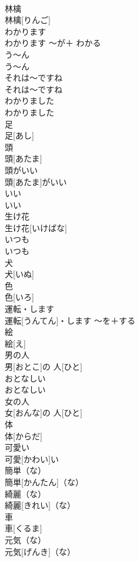 \documentclass[8pt]{extreport}
\begin{document}
\begin{CJK}{UTF8}{min}
\\	林檎	
\\	林檎[りんご]		
\\	わかります	
\\	わかります	〜が＋ わかる	
\\	う〜ん	
\\	う〜ん		
\\	それは〜ですね	
\\	それは〜ですね		
\\	わかりました	
\\	わかりました		
\\	足	
\\	足[あし]		
\\	頭	
\\	頭[あたま]		
\\	頭がいい	
\\	頭[あたま]がいい		
\\	いい	
\\	いい		
\\	生け花	
\\	生け花[いけばな]		
\\	いつも	
\\	いつも		
\\	犬	
\\	犬[いぬ]		
\\	色	
\\	色[いろ]		
\\	運転・します	
\\	運転[うんてん]・します	〜を＋する	
\\	絵	
\\	絵[え]		
\\	男の人	
\\	男[おとこ]の 人[ひと]		
\\	おとなしい	
\\	おとなしい		
\\	女の人	
\\	女[おんな]の 人[ひと]		
\\	体	
\\	体[からだ]		
\\	可愛い	
\\	可愛[かわい]い		
\\	簡単（な）	
\\	簡単[かんたん]（な）		
\\	綺麗（な）	
\\	綺麗[きれい]（な）		
\\	車	
\\	車[くるま]		
\\	元気（な）	
\\	元気[げんき]（な）		

\end{CJK}
\end{document}
